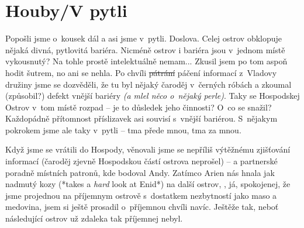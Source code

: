 \documentclass[a4paper,twocolumn,openany,nodeprecatedcode, justified]{dndbook}
\begin{document}
	\section[Sezení 3]{Houby/V pytli}
	Popošli jsme o~kousek dál a asi jsme v~pytli. Doslova. Celej ostrov obklopuje nějaká divná, pytlovitá bariéra. Nicméně ostrov i bariéra jsou v~jednom místě vykousnutý? Na tohle prostě intelektuálně nemam... Zkusil jsem po tom aspoň hodit šutrem, no ani se nehla. Po chvíli \sout{pátrání} páčení informací z~Vladovy družiny jsme se dozvěděli, že tu byl nějaký čaroděj v~černých róbách a zkoumal (způsobil?) defekt vnější bariéry \emph{(a mlel něco o~nějaký perle)}. Taky se Hospodskej Ostrov v~tom místě rozpad -- je to důsledek jeho činnosti? O~co se snažil? Každopádně přítomnost příslizavek asi souvisí s~vnější bariérou. S~nějakym pokrokem jsme ale taky v~pytli -- tma přede mnou, tma za mnou.
	
	Když jsme se vrátili do Hospody, věnovali jsme se nepříliš výtěžnému zjišťování informací (čaroděj zjevně Hospodskou částí ostrova neprošel) -- a partnerské poradně místních patronů, kde \emph{} bodoval Andy. Zatímco Arien nás hnala jak nadmutý kozy (*takes a \emph{hard} look at Enid*) na další ostrov, , já, spokojenej, že jsme projednou na příjemnym ostrově s~dostatkem nezbytností jako maso a medovina, jsem si ještě prosadil o~příjemnou chvíli navíc. Ještěže tak, neboť následující ostrov už zdaleka tak příjemnej nebyl.
	
\end{document}
